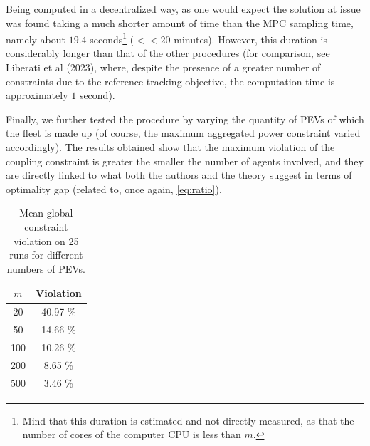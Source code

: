 Being computed in a decentralized way, as one would expect the solution at issue was found taking a much shorter amount of time than the MPC sampling time, namely about $19.4$ seconds\footnote[3]{Mind that this duration is estimated and not directly measured, as that the number of cores of the computer CPU is less than $m$.} ($<< 20$ minutes). However, this duration is considerably longer than that of the other procedures (for comparison, see Liberati et al (2023)\supercite{liberati}, where, despite the presence of a greater number of constraints due to the reference tracking objective, the computation time is approximately $1$ second).

Finally, we further tested the procedure by varying the quantity of PEVs of which the fleet is made up (of course, the maximum aggregated power constraint varied accordingly). The results obtained show that the maximum violation of the coupling constraint is greater the smaller the number of agents involved, and they are directly linked to what both the authors and the theory suggest in terms of optimality gap (related to, once again, \ref{eq:ratio}).

\begin{table}[H]
    \centering
    \begin{tabular}{|c|c|}
        \hline
        $m$ & Violation \\
        \hline
        20  & 40.97 \% \\
        50  & 14.66 \% \\
        100 & 10.26 \% \\
        200 & 8.65 \% \\
        500 & 3.46 \% \\
        \hline
    \end{tabular}
    \label{table:violation}
    \caption{Mean global constraint violation on 25 runs for different numbers of PEVs.}
\end{table}